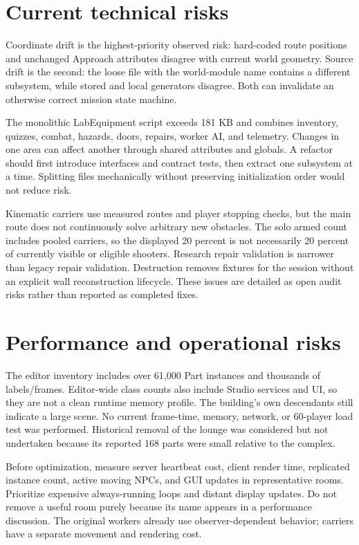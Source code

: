 \section{Current technical risks}
Coordinate drift is the highest-priority observed risk: hard-coded route positions and unchanged Approach attributes disagree with current world geometry.\allowbreak{} Source drift is the second: the loose file with the world-module name contains a different subsystem, while stored and local generators disagree.\allowbreak{} Both can invalidate an otherwise correct mission state machine.\allowbreak{}

The monolithic LabEquipment script exceeds 181 KB and combines inventory, quizzes, combat, hazards, doors, repairs, worker AI, and telemetry.\allowbreak{} Changes in one area can affect another through shared attributes and globals.\allowbreak{} A refactor should first introduce interfaces and contract tests, then extract one subsystem at a time.\allowbreak{} Splitting files mechanically without preserving initialization order would not reduce risk.\allowbreak{}

Kinematic carriers use measured routes and player stopping checks, but the main route does not continuously solve arbitrary new obstacles.\allowbreak{} The solo armed count includes pooled carriers, so the displayed 20 percent is not necessarily 20 percent of currently visible or eligible shooters.\allowbreak{} Research repair validation is narrower than legacy repair validation.\allowbreak{} Destruction removes fixtures for the session without an explicit wall reconstruction lifecycle.\allowbreak{} These issues are detailed as open audit risks rather than reported as completed fixes.\allowbreak{}

\section{Performance and operational risks}
The editor inventory includes over 61,000 Part instances and thousands of labels/\allowbreak{}frames.\allowbreak{} Editor-wide class counts also include Studio services and UI, so they are not a clean runtime memory profile.\allowbreak{} The building's own descendants still indicate a large scene.\allowbreak{} No current frame-time, memory, network, or 60-player load test was performed.\allowbreak{} Historical removal of the lounge was considered but not undertaken because its reported 168 parts were small relative to the complex.\allowbreak{}

Before optimization, measure server heartbeat cost, client render time, replicated instance count, active moving NPCs, and GUI updates in representative rooms.\allowbreak{} Prioritize expensive always-running loops and distant display updates.\allowbreak{} Do not remove a useful room purely because its name appears in a performance discussion.\allowbreak{} The original workers already use observer-dependent behavior; carriers have a separate movement and rendering cost.\allowbreak{}


